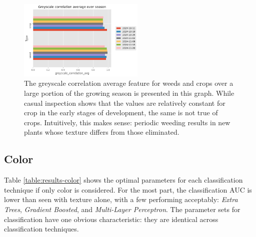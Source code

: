 \documentclass[letterpaper]{article}
\begin{document}
{\begin{figure}[h!]
	\centering
	\includegraphics[width=6cm]{./figures/plot-over-season.png}
	\caption[Greyscale Correlation Average over growing season]{The greyscale correlation average feature for weeds and crops over a large portion of the growing season is presented in this graph. While casual inspection shows that the values are relatively constant for crop in the early stages of development, the same is not true of crops. Intuitively, this makes sense: periodic weeding results in new plants whose texture differs from those eliminated.}
	\label{fig:season-texture-correlation}
\end{figure}

\subsection{Color}
Table \ref{table:results-color} shows the optimal parameters for each classification technique if only color is considered. For the most part, the classification AUC is lower than seen with texture alone, with a few performing acceptably: \textit{Extra Trees}, \textit{Gradient Boosted}, and \textit{Multi-Layer Perceptron}.  The parameter sets for classification have one obvious characteristic: they are identical across classification techniques.


{
\renewcommand{\arraystretch}{0.9}

}}
\end{document}
